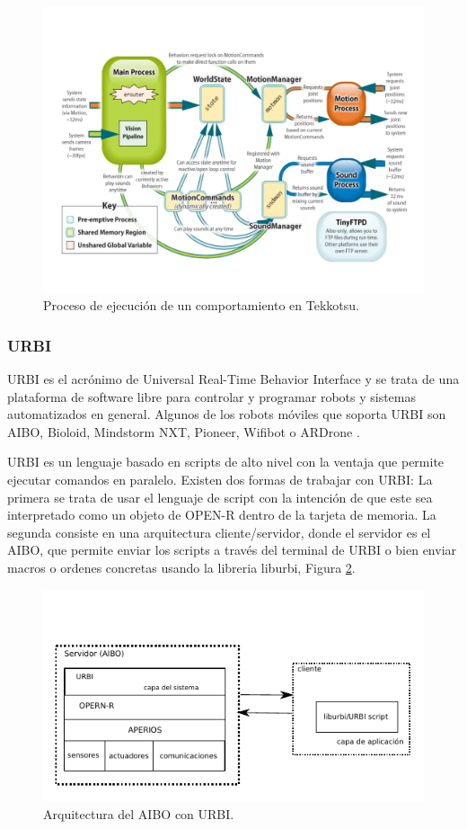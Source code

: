 \documentclass[12pt,a4paper,final,twoside]{article}
\begin{document}
 
\begin{figure}[h!]
	\centering
    \includegraphics[scale=0.3]{images/tekkotsuarch.pdf}
	 \caption{Proceso de ejecución de un comportamiento en Tekkotsu.}
  \label{fig:tekkarch}
\end{figure}

\subsubsection{URBI}
\label{urbi}
URBI es el acrónimo de Universal Real-Time Behavior Interface y se trata de una plataforma de software libre para controlar y programar robots y sistemas automatizados en general. Algunos de los robots móviles que soporta URBI son AIBO, Bioloid, Mindstorm NXT, Pioneer, Wifibot o ARDrone \cite{urbi}.

URBI es un lenguaje basado en scripts de alto nivel con la ventaja que permite ejecutar comandos en paralelo. Existen dos formas de trabajar con URBI: La primera  se trata de usar el lenguaje de script con la intención de que este sea interpretado como un objeto de OPEN-R dentro de la tarjeta de memoria. La segunda consiste en una arquitectura cliente/servidor, donde el servidor es el AIBO, que permite enviar los scripts a través del terminal de URBI o bien enviar macros o ordenes concretas usando la libreria liburbi, Figura \ref{fig:urbiarc}. 

\begin{figure}[h!]
	\centering
    \includegraphics[scale=1.4]{images/urbiarc.pdf}
	 \caption{Arquitectura del AIBO con URBI.}
  \label{fig:urbiarc}
\end{figure}
\end{document}
